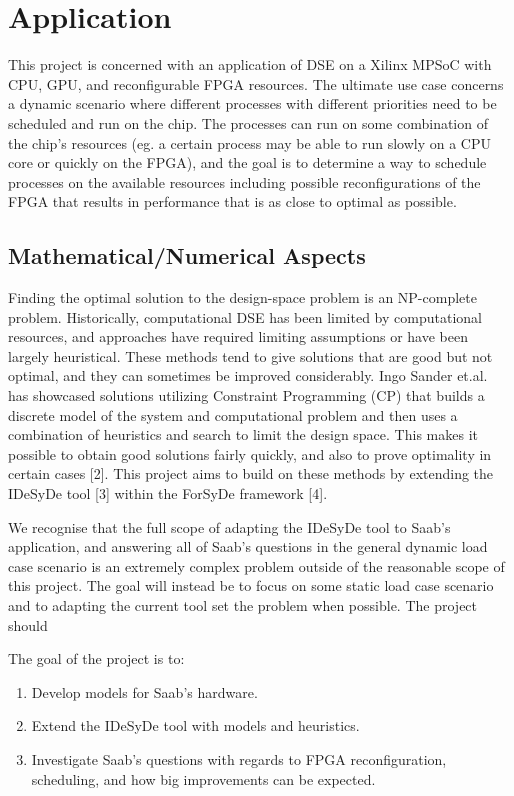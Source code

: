 \documentclass[12pt,titlepage]{article}
\begin{document}
\section{Application}
This project is concerned with an application of DSE on a Xilinx MPSoC with CPU, GPU, and reconfigurable FPGA resources. The ultimate use case concerns a dynamic scenario where different processes with different priorities need to be scheduled and run on the chip. The processes can run on some combination of the chip's resources (eg. a certain process may be able to run slowly on a CPU core or quickly on the FPGA), and the goal is to determine a way to schedule processes on the available resources including possible reconfigurations of the FPGA that results in performance that is as close to optimal as possible.

\subsection{Mathematical/Numerical Aspects}
Finding the optimal solution to the design-space problem is an NP-complete problem. Historically, computational DSE has been limited by computational resources, and approaches have required limiting assumptions or have been largely heuristical. These methods tend to give solutions that are good but not optimal, and they can sometimes be improved considerably. Ingo Sander et.al. has showcased solutions utilizing Constraint Programming (CP) that builds a discrete model of the system and computational problem and then uses a combination of heuristics and search to limit the design space. This makes it possible to obtain good solutions fairly quickly, and also to prove optimality in certain cases [2]. This project aims to build on these methods by extending the IDeSyDe tool [3] within the ForSyDe framework [4].

We recognise that the full scope of adapting the IDeSyDe tool to Saab's application, and answering all of Saab's questions in the general dynamic load case scenario is an extremely complex problem outside of the reasonable scope of this project. The goal will instead be to focus on some static load case scenario and to adapting the current tool set the problem when possible. The project should 

The goal of the project is to:
\begin{enumerate}
\item Develop models for Saab's hardware.
\item Extend the IDeSyDe tool with models and heuristics.
\item Investigate Saab's questions with regards to FPGA reconfiguration, scheduling, and how big improvements can be expected.
\end{enumerate}
\end{document}
